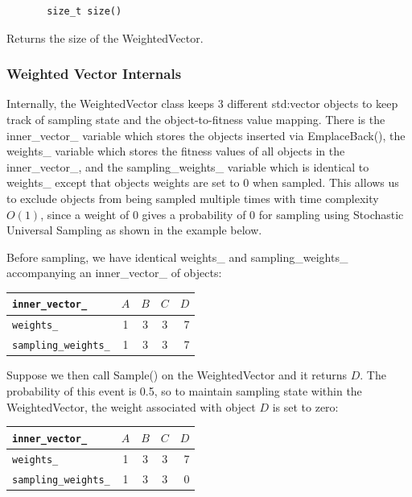 \documentclass[12pt]{article}
\begin{document}
     \begin{verbatim}
       size_t size()
     \end{verbatim}

     Returns the size of the WeightedVector.

    \subsubsection{Weighted Vector Internals}

    Internally, the WeightedVector class keeps 3 different std:vector objects
    to keep track of sampling state and the object-to-fitness value mapping.
    There is the inner\_vector\_ variable which stores the objects
    inserted via EmplaceBack(), the weights\_ variable which stores the
    fitness values of all objects in the inner\_vector\_, and the
    sampling\_weights\_ variable which is identical to weights\_
    except that objects weights are set to 0 when sampled. This allows us to
    exclude objects from being sampled multiple times with time complexity
    $O(1)$, since a weight of 0 gives a probability of 0 for sampling using
    Stochastic Universal Sampling as shown in the example below.

    Before sampling, we have identical weights\_ and sampling\_weights\_
    accompanying an inner\_vector\_ of objects:

    \begin{center}
      \begin{tabular}{ | l | c | c | c | r | }
        \hline
        \verb|inner_vector_| & $A$ & $B$ & $C$ & $D$ \\ \hline
        \verb|weights_| & 1 & 3 & 3 & 7 \\ \hline
        \verb|sampling_weights_| & 1 & 3 & 3 & 7 \\ \hline
        \hline
      \end{tabular}
    \end{center}

    Suppose we then call Sample() on the WeightedVector and it returns $D$. The
    probability of this event is 0.5, so to maintain sampling state within the
    WeightedVector, the weight associated with object $D$ is set to zero:

    \begin{center}
      \begin{tabular}{ | l | c | c | c | r | }
        \hline
        \verb|inner_vector_| & $A$ & $B$ & $C$ & $D$ \\ \hline
        \verb|weights_| & 1 & 3 & 3 & 7 \\ \hline
        \verb|sampling_weights_| & 1 & 3 & 3 & 0 \\ \hline
        \hline
      \end{tabular}
    \end{center}
\end{document}
